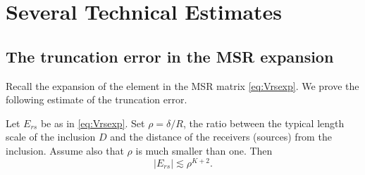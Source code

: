 \chapter{Several Technical Estimates}\label{sec:append-sever-techn}
\section{The truncation error in the MSR expansion}
\label{sec:app1}

Recall the expansion of the element in the MSR matrix
\eqref{eq:Vrsexp}. We prove the following estimate of the
truncation error.
\begin{proposition} \label{prop:Ers}
Let $E_{rs}$ be as in \eqref{eq:Vrsexp}. Set $\rho = \delta/R$,
the ratio between the typical length scale of the inclusion $D$
and the distance of the receivers (sources) from the inclusion.
Assume also that $\rho$ is much smaller than one. Then
\begin{equation}
|E_{rs}| \lesssim \rho^{K+2}. \label{eq:prop:Ers}
\end{equation}
\end{proposition}
